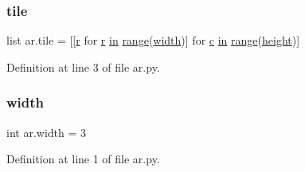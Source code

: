 \subsubsection{\texorpdfstring{tile}{tile}}
{\footnotesize\ttfamily list ar.\+tile = \mbox{[}\mbox{[}\mbox{\hyperlink{_s_d_l__opengl_8h_a42ce7cdc612e53abee15043f80220d97}{r}} for \mbox{\hyperlink{_s_d_l__opengl_8h_a42ce7cdc612e53abee15043f80220d97}{r}} \mbox{\hyperlink{_s_d_l__opengl__glext_8h_a83ad0ee7f1e06b59c90271716e689080}{in}} \mbox{\hyperlink{_s_d_l__opengl__glext_8h_a73b00379db2c7ac5e30a3aa2954a50ee}{range}}(\mbox{\hyperlink{_s_d_l__opengl_8h_a9a82cf3caff84cabc4598e2619faac17}{width}})\mbox{]} for \mbox{\hyperlink{_s_d_l__opengl__glext_8h_a1f2d7f8147412c43ba2303a56f97ee73}{c}} \mbox{\hyperlink{_s_d_l__opengl__glext_8h_a83ad0ee7f1e06b59c90271716e689080}{in}} \mbox{\hyperlink{_s_d_l__opengl__glext_8h_a73b00379db2c7ac5e30a3aa2954a50ee}{range}}(\mbox{\hyperlink{_s_d_l__opengl_8h_aa352f2804b9902ac30769c00dde75d5f}{height}})\mbox{]}}



Definition at line 3 of file ar.\+py.

\mbox{\label{namespacear_a5f494bd55c46dd558e0b0ddd7d05d19d}} 
\subsubsection{\texorpdfstring{width}{width}}
{\footnotesize\ttfamily int ar.\+width = 3}



Definition at line 1 of file ar.\+py.

